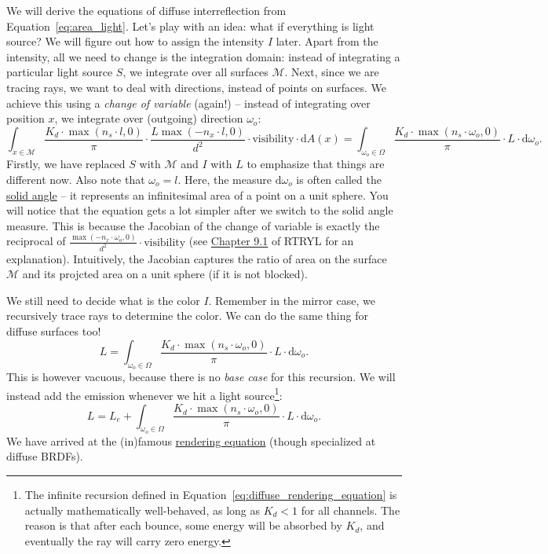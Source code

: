 We will derive the equations of diffuse interreflection from Equation~\eqref{eq:area_light}. Let's play with an idea: what if everything is light source? We will figure out how to assign the intensity $I$ later. Apart from the intensity, all we need to change is the integration domain: instead of integrating a particular light source $S$, we integrate over all surfaces $\mathcal{M}$. Next, since we are tracing rays, we want to deal with directions, instead of points on surfaces. We achieve this using a \emph{change of variable} (again!) -- instead of integrating over position $x$, we integrate over (outgoing) direction $\omega_o$:
\begin{equation}
\int_{x \in \mathcal{M}} \frac{K_d \cdot \max\left(n_s \cdot l, 0\right)}{\pi} \cdot \frac{L \max\left(-n_x \cdot l, 0\right)}{d^2} \cdot \text{visibility} \cdot \mathrm{d}A(x) = 
\int_{\omega_o \in \Omega} \frac{K_d \cdot \max\left(n_s \cdot \omega_o, 0\right)}{\pi} \cdot L \cdot \mathrm{d}\omega_o.
\label{eq:area_light_solid_angle}
\end{equation}
Firstly, we have replaced $S$ with $\mathcal{M}$ and $I$ with $L$ to emphasize that things are different now.
Also note that $\omega_o = l$.
Here, the measure $\mathrm{d}\omega_o$ is often called the \href{https://en.wikipedia.org/wiki/Solid_angle}{solid angle} -- it represents an infinitesimal area of a point on a unit sphere. You will notice that the equation gets a lot simpler after we switch to the solid angle measure. This is because the Jacobian of the change of variable is exactly the reciprocal of $\frac{\max\left(-n_x \cdot \omega_o, 0\right)}{d^2} \cdot \text{visibility}$ (see \href{https://raytracing.github.io/books/RayTracingTheRestOfYourLife.html#samplinglightsdirectly/gettingthepdfofalight}{Chapter 9.1} of RTRYL for an explanation). Intuitively, the Jacobian captures the ratio of area on the surface $\mathcal{M}$ and its projcted area on a unit sphere (if it is not blocked).

We still need to decide what is the color $I$. Remember in the mirror case, we recursively trace rays to determine the color. We can do the same thing for diffuse surfaces too!
\begin{equation}
L = \int_{\omega_o \in \Omega} \frac{K_d \cdot \max\left(n_s \cdot \omega_o, 0\right)}{\pi} \cdot L \cdot \mathrm{d}\omega_o.
\end{equation}
This is however vacuous, because there is no \emph{base case} for this recursion. We will instead add the emission whenever we hit a light source\footnote{The infinite recursion defined in Equation~\eqref{eq:diffuse_rendering_equation} is actually mathematically well-behaved, as long as $K_d < 1$ for all channels. The reason is that after each bounce, some energy will be absorbed by $K_d$, and eventually the ray will carry zero energy.}:
\begin{equation}
L = L_e + \int_{\omega_o \in \Omega} \frac{K_d \cdot \max\left(n_s \cdot \omega_o, 0\right)}{\pi} \cdot L \cdot \mathrm{d}\omega_o.
\label{eq:diffuse_rendering_equation}
\end{equation}
We have arrived at the (in)famous \href{https://en.wikipedia.org/wiki/Rendering_equation}{rendering equation} (though specialized at diffuse BRDFs).


